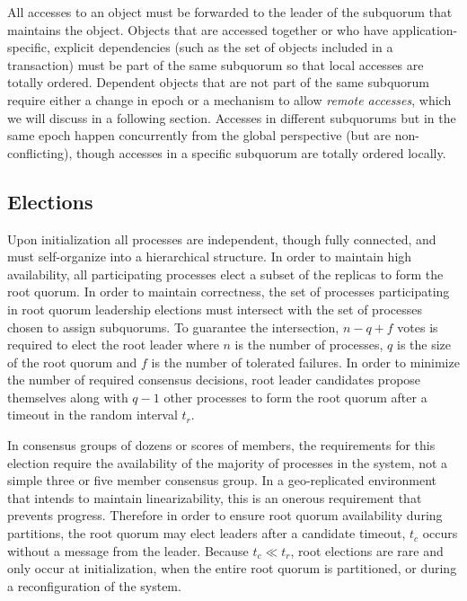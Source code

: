 \documentclass[sigconf]{acmart}
\begin{document}
All accesses to an object must be forwarded to the leader of the subquorum that maintains
the object.
Objects that are accessed together or who have application-specific, explicit
dependencies (such as the set of objects included in a transaction) must be part of the
same subquorum so that local accesses are totally ordered.
Dependent objects that are not part of the same subquorum require either a change in
epoch or a mechanism to allow \emph{remote accesses}, which we will discuss in a
following section.
Accesses in different subquorums but in the same epoch happen concurrently
from the global perspective (but are non-conflicting), though accesses in a
specific subquorum are totally ordered locally.

\subsection{Elections}

Upon initialization all processes are independent, though fully connected, and must
self-organize into a hierarchical structure.
In order to maintain high availability, all participating processes elect a subset of the
replicas to form the root quorum.
In order to maintain correctness, the set of processes participating in root quorum
leadership elections must intersect with the set of processes chosen to assign
subquorums.
To guarantee the intersection, $n - q + f$ votes is required to elect the root leader
where $n$ is the number of processes, $q$ is the size of the root quorum and $f$ is the
number of tolerated failures.
In order to minimize the number of required consensus decisions, root leader candidates
propose themselves along with $q-1$ other processes to form the root quorum after a
timeout in the random interval $t_r$.

In consensus groups of dozens or scores of members, the requirements for this election
require the availability of the majority of processes in the system, not a simple three
or five member consensus group.
In a geo-replicated environment that intends to maintain linearizability, this is an
onerous requirement that prevents progress.
Therefore in order to ensure root quorum availability during partitions, the root quorum
may elect leaders after a candidate timeout, $t_c$ occurs without a message from the
leader.
Because $t_c \ll t_r$, root elections are rare and only occur at initialization, when the
entire root quorum is partitioned, or during a reconfiguration of the system.
\end{document}
